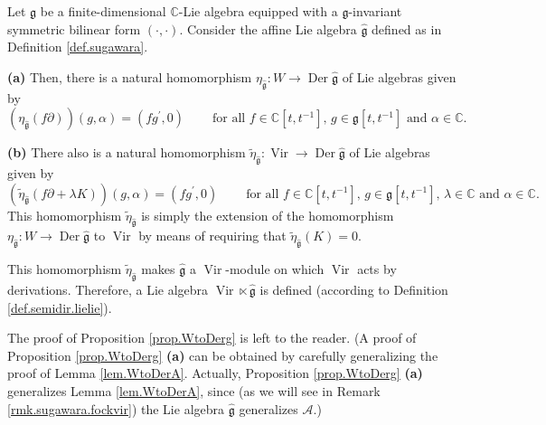\documentclass[etingof-lie.tex]{subfiles}
\begin{document}
\begin{proposition}
\label{prop.WtoDerg}Let $\mathfrak{g}$ be a finite-dimensional $\mathbb{C}%
$-Lie algebra equipped with a $\mathfrak{g}$-invariant symmetric bilinear form
$\left(  \cdot,\cdot\right)  $. Consider the affine Lie algebra
$\widehat{\mathfrak{g}}$ defined as in Definition \ref{def.sugawara}.

\textbf{(a)} Then, there is a natural homomorphism $\eta
_{\widehat{\mathfrak{g}}}:W\rightarrow\operatorname*{Der}\widehat{\mathfrak{g}%
}$ of Lie algebras given by
\[
\left(  \eta_{\widehat{\mathfrak{g}}}\left(  f\partial\right)  \right)
\left(  g,\alpha\right)  =\left(  fg^{\prime},0\right)
\ \ \ \ \ \ \ \ \ \ \text{for all }f\in\mathbb{C}\left[  t,t^{-1}\right]
\text{, }g\in\mathfrak{g}\left[  t,t^{-1}\right]  \text{ and }\alpha
\in\mathbb{C}.
\]


\textbf{(b)} There also is a natural homomorphism $\widetilde{\eta
}_{\widehat{\mathfrak{g}}}:\operatorname*{Vir}\rightarrow\operatorname*{Der}%
\widehat{\mathfrak{g}}$ of Lie algebras given by
\[
\left(  \widetilde{\eta}_{\widehat{\mathfrak{g}}}\left(  f\partial+\lambda
K\right)  \right)  \left(  g,\alpha\right)  =\left(  fg^{\prime},0\right)
\ \ \ \ \ \ \ \ \ \ \text{for all }f\in\mathbb{C}\left[  t,t^{-1}\right]
\text{, }g\in\mathfrak{g}\left[  t,t^{-1}\right]  \text{, }\lambda
\in\mathbb{C}\text{ and }\alpha\in\mathbb{C}.
\]
This homomorphism $\widetilde{\eta}_{\widehat{\mathfrak{g}}}$ is simply the
extension of the homomorphism $\eta_{\widehat{\mathfrak{g}}}:W\rightarrow
\operatorname*{Der}\widehat{\mathfrak{g}}$ to $\operatorname*{Vir}$ by means
of requiring that $\widetilde{\eta}_{\widehat{\mathfrak{g}}}\left(  K\right)
=0$.

This homomorphism $\widetilde{\eta}_{\widehat{\mathfrak{g}}}$ makes
$\widehat{\mathfrak{g}}$ a $\operatorname*{Vir}$-module on which
$\operatorname*{Vir}$ acts by derivations. Therefore, a Lie algebra
$\operatorname*{Vir}\ltimes\widehat{\mathfrak{g}}$ is defined (according to
Definition \ref{def.semidir.lielie}).
\end{proposition}

The proof of Proposition \ref{prop.WtoDerg} is left to the reader. (A proof of
Proposition \ref{prop.WtoDerg} \textbf{(a)} can be obtained by carefully
generalizing the proof of Lemma \ref{lem.WtoDerA}. Actually, Proposition
\ref{prop.WtoDerg} \textbf{(a)} generalizes Lemma \ref{lem.WtoDerA}, since (as
we will see in Remark \ref{rmk.sugawara.fockvir}) the Lie algebra
$\widehat{\mathfrak{g}}$ generalizes $\mathcal{A}$.)
\end{document}

